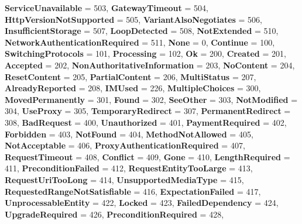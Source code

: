 \begin{DoxyCompactItemize}
{\bfseries Service\+Unavailable} = 503, 
{\bfseries Gateway\+Timeout} = 504, 
{\bfseries Http\+Version\+Not\+Supported} = 505, 
{\bfseries Variant\+Also\+Negotiates} = 506, 
\newline
{\bfseries Insufficient\+Storage} = 507, 
{\bfseries Loop\+Detected} = 508, 
{\bfseries Not\+Extended} = 510, 
{\bfseries Network\+Authentication\+Required} = 511, 
\newline
{\bfseries None} = 0, 
{\bfseries Continue} = 100, 
{\bfseries Switching\+Protocols} = 101, 
{\bfseries Processing} = 102, 
\newline
{\bfseries Ok} = 200, 
{\bfseries Created} = 201, 
{\bfseries Accepted} = 202, 
{\bfseries Non\+Authoritative\+Information} = 203, 
\newline
{\bfseries No\+Content} = 204, 
{\bfseries Reset\+Content} = 205, 
{\bfseries Partial\+Content} = 206, 
{\bfseries Multi\+Status} = 207, 
\newline
{\bfseries Already\+Reported} = 208, 
{\bfseries I\+M\+Used} = 226, 
{\bfseries Multiple\+Choices} = 300, 
{\bfseries Moved\+Permanently} = 301, 
\newline
{\bfseries Found} = 302, 
{\bfseries See\+Other} = 303, 
{\bfseries Not\+Modified} = 304, 
{\bfseries Use\+Proxy} = 305, 
\newline
{\bfseries Temporary\+Redirect} = 307, 
{\bfseries Permanent\+Redirect} = 308, 
{\bfseries Bad\+Request} = 400, 
{\bfseries Unauthorized} = 401, 
\newline
{\bfseries Payment\+Required} = 402, 
{\bfseries Forbidden} = 403, 
{\bfseries Not\+Found} = 404, 
{\bfseries Method\+Not\+Allowed} = 405, 
\newline
{\bfseries Not\+Acceptable} = 406, 
{\bfseries Proxy\+Authentication\+Required} = 407, 
{\bfseries Request\+Timeout} = 408, 
{\bfseries Conflict} = 409, 
\newline
{\bfseries Gone} = 410, 
{\bfseries Length\+Required} = 411, 
{\bfseries Precondition\+Failed} = 412, 
{\bfseries Request\+Entity\+Too\+Large} = 413, 
\newline
{\bfseries Request\+Uri\+Too\+Long} = 414, 
{\bfseries Unsupported\+Media\+Type} = 415, 
{\bfseries Requested\+Range\+Not\+Satisfiable} = 416, 
{\bfseries Expectation\+Failed} = 417, 
\newline
{\bfseries Unprocessable\+Entity} = 422, 
{\bfseries Locked} = 423, 
{\bfseries Failed\+Dependency} = 424, 
{\bfseries Upgrade\+Required} = 426, 
\newline
{\bfseries Precondition\+Required} = 428, 

\end{DoxyCompactItemize}
